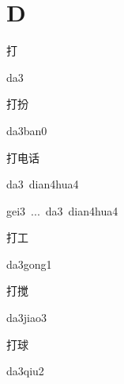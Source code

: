 ﻿%
\section*{D}

\begin{verbete}[da3]{打}
\begin{pronuncia}{da3}
\end{pronuncia}
\end{verbete}

\begin{verbete}[da3ban0]{打扮}
\begin{pronuncia}{da3ban0}
\end{pronuncia}
\end{verbete}

\begin{verbete}{打电话}
\begin{pronuncia}{da3\ dian4hua4}
\end{pronuncia}
\begin{pronuncia}{gei3\ ...\ da3\ dian4hua4}
\end{pronuncia}
\end{verbete}

\begin{verbete}[da3gong1]{打工}
\begin{pronuncia}{da3gong1}
\end{pronuncia}
\end{verbete}

\begin{verbete}[da3jiao3]{打搅}
\begin{pronuncia}{da3jiao3}
\end{pronuncia}
\end{verbete}

\begin{verbete}[da3qiu2]{打球}
\begin{pronuncia}{da3qiu2}
\end{pronuncia}
\end{verbete}

